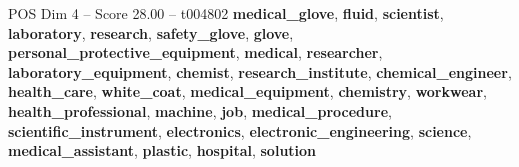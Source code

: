 \begin{textsample}{POS Dim 4 – Score 28.00 – t004802}  \label{ex:f4_pos_031}
\textbf{medical\_glove}, \textbf{fluid}, \textbf{scientist}, \textbf{laboratory}, \textbf{research}, \textbf{safety\_glove}, \textbf{glove}, \textbf{personal\_protective\_equipment}, \textbf{medical}, \textbf{researcher}, \textbf{laboratory\_equipment}, \textbf{chemist}, \textbf{research\_institute}, \textbf{chemical\_engineer}, \textbf{health\_care}, \textbf{white\_coat}, \textbf{medical\_equipment}, \textbf{chemistry}, \textbf{workwear}, \textbf{health\_professional}, \textbf{machine}, \textbf{job}, \textbf{medical\_procedure}, \textbf{scientific\_instrument}, \textbf{electronics}, \textbf{electronic\_engineering}, \textbf{science}, \textbf{medical\_assistant}, \textbf{plastic}, \textbf{hospital}, \textbf{solution}

\end{textsample}
